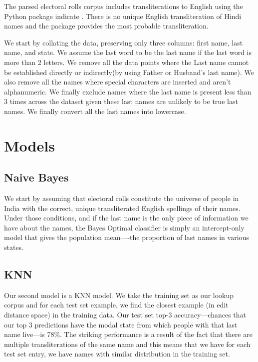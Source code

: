 \documentclass[11pt,  letterpaper]{article}
\begin{document}
The parsed electoral rolls corpus \citep{DVN/MUEGDT_2018} includes transliterations to English using the Python package indicate \citep{Chintalapati_Indicate_Transliterate_Indic_2022}. There is no unique English transliteration of Hindi names and the package provides the most probable transliteration. 

We start by collating the data, preserving only three columns: first name, last name, and state. We assume the last word to be the last name if the last word is more than 2 letters. We remove all the data points where the Last name cannot be established directly or indirectly(by using Father or Husband’s last name). We also remove all the names where special characters are inserted and aren’t alphanumeric. We finally exclude names where the last name is present less than 3 times across the dataset given these last names are unlikely to be true last names. We finally convert all the last names into lowercase. 

\section{Models}

\subsection{Naive Bayes}

We start by assuming that electoral rolls constitute the universe of people in India with the correct, unique transliterated English spellings of their names. Under those conditions, and if the last name is the only piece of information we have about the names, the Bayes Optimal classifier is simply an intercept-only model that gives the population mean—-the proportion of last names in various states. 

\subsection{KNN}

Our second model is a KNN model. We take the training set as our lookup corpus and for each test set example, we find the closest example (in edit distance space) in the training data. Our test set top-3 accuracy---chances that our top 3 predictions have the modal state from which people with that last name live---is 78\%. The striking performance is a result of the fact that there are multiple transliterations of the same name and this means that we have for each test set entry, we have names with similar distribution in the training set.
\end{document}
